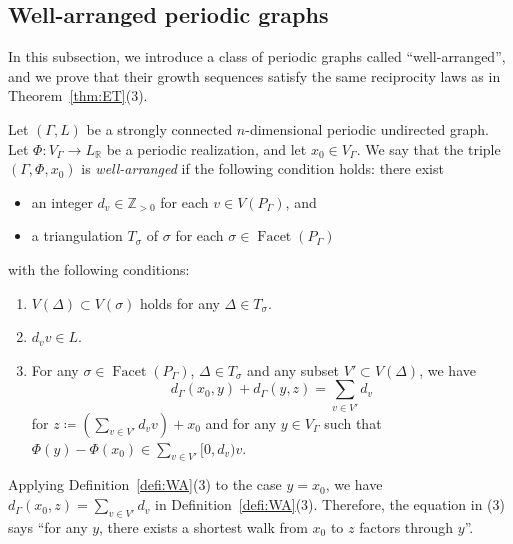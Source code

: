\documentclass[ALCO,published]{cedram}
\theoremstyle{remark}
\begin{document}
\subsection{Well-arranged periodic graphs}\label{subsection:WA}
In this subsection, we introduce a class of periodic graphs called ``well-arranged'', 
and we prove that their growth sequences satisfy the same reciprocity laws as in Theorem~\ref{thm:ET}(3). 

\begin{defi}\label{defi:WA}
Let $(\Gamma , L)$ be a strongly connected $n$-dimensional periodic undirected graph. 
Let $\Phi : V_{\Gamma} \to L_{\mathbb{R}}$ be a periodic realization, 
and let $x_0 \in V_{\Gamma}$. We say that the triple $(\Gamma, \Phi, x_0)$ is \textit{well-arranged} if 
the following condition holds: 
there exist 
\begin{itemize}
\item 
an integer $d_v \in \mathbb{Z}_{>0}$ for each $v \in V(P_{\Gamma})$, and 
\item 
a triangulation $T_{\sigma}$ of $\sigma$ for each $\sigma \in \operatorname{Facet}(P_{\Gamma})$
\end{itemize}
with the following conditions: 
\begin{enumerate}
\item 
$V(\Delta) \subset V(\sigma)$ holds for any $\Delta \in T_\sigma$. 

\item 
$d_v v \in L$. 

\item
For any $\sigma \in \operatorname{Facet}(P_{\Gamma})$, $\Delta \in T_{\sigma}$ and any subset $V' \subset V(\Delta)$, we have  
\[
d_{\Gamma}(x_0, y) + d_{\Gamma}(y, z) = \sum _{v \in V'} d_v
\]
for $z \coloneqq  \left( \sum _{v \in V'} d_v v \right) + x_0$ and for any $y \in V_{\Gamma}$ 
such that $\Phi(y) - \Phi(x_0) \in \sum _{v \in V'} [0,d_v) v$. 
\end{enumerate}
\end{defi}

\begin{rmk}
Applying Definition~\ref{defi:WA}(3) to the case $y=x_0$, we have $d_{\Gamma}(x_0, z) = \sum _{v \in V'} d_v$ in Definition~\ref{defi:WA}(3). 
Therefore, the equation in (3) says 
``for any $y$, there exists a shortest walk from $x_0$ to $z$ factors through $y$''. 
\end{rmk}
\end{document}

